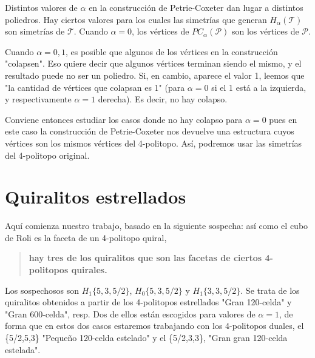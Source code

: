 \documentclass[spanish]{article}
\theoremstyle{definition}
\newtheorem*{teo}{Teorema}
\begin{document}
	Distintos valores de $\alpha$ en la construcción de Petrie-Coxeter dan lugar a distintos poliedros. Hay ciertos valores para los cuales las simetrías que generan $H_\alpha(\mathcal{T})$ son simetrías de $\mathcal{T}$. Cuando $\alpha=0$, los vértices de $PC_\alpha(\mathcal{P})$ son los vértices de $\mathcal{P}$.
	
	Cuando $\alpha=0,1$, es posible que algunos de los vértices en la construcción "colapsen". Eso quiere decir que algunos vértices terminan siendo el mismo, y el resultado puede no ser un poliedro. Si, en cambio, aparece el valor 1, leemos que "la cantidad de vértices que colapsan es 1" (para $\alpha=0$ si el 1 está a la izquierda, y respectivamente $\alpha=1$ derecha). Es decir, no hay colapso.
	
	Conviene entonces estudiar los casos donde no hay colapso para $\alpha=0$ pues en este caso la construcción de Petrie-Coxeter nos devuelve una estructura cuyos vértices son los mismos vértices del 4-politopo. Así, podremos usar las simetrías del 4-politopo original.
	
	
	
	
	
	\section{Quiralitos estrellados}
	Aquí comienza nuestro trabajo, basado en la siguiente sospecha: así como el cubo de Roli es la faceta de un 4-politopo quiral, 
	
	\begin{quote}\textbf{hay tres de los quiralitos que son las facetas de ciertos 4-politopos quirales.}\end{quote}
	
	Los sospechosos son $H_1\{5,3,5/2\}$, $H_0\{5,3,5/2\}$ y $H_1\{3,3,5/2\}$. Se trata de los quiralitos obtenidos a partir de los 4-politopos estrellados "Gran 120-celda" y "Gran 600-celda", resp. Dos de ellos están escogidos para valores de $\alpha=1$, de forma que en estos dos casos estaremos trabajando con los 4-politopos duales, el \{5/2,5,3\} "Pequeño 120-celda estelado" y el \{5/2,3,3\}, "Gran gran 120-celda estelada".
	
\end{document}
